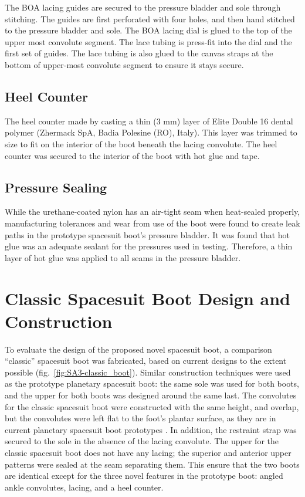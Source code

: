 \documentclass[defaultstyle,11pt]{comps}
\begin{document}
The BOA lacing guides are secured to the pressure bladder and sole through stitching.
The guides are first perforated with four holes, and then hand stitched to the pressure bladder and sole.
The BOA lacing dial is glued to the top of the upper most convolute segment.
The lace tubing is press-fit into the dial and the first set of guides.
The lace tubing is also glued to the canvas straps at the bottom of upper-most convolute segment to ensure it stays secure.

\hypertarget{heel-counter-1}{%
\subsection{Heel Counter}\label{heel-counter-1}}

The heel counter made by casting a thin (3 mm) layer of Elite Double 16 dental polymer (Zhermack SpA, Badia Polesine (RO), Italy).
This layer was trimmed to size to fit on the interior of the boot beneath the lacing convolute.
The heel counter was secured to the interior of the boot with hot glue and tape.

\hypertarget{pressure-sealing}{%
\subsection{Pressure Sealing}\label{pressure-sealing}}

While the urethane-coated nylon has an air-tight seam when heat-sealed properly, manufacturing tolerances and wear from use of the boot were found to create leak paths in the prototype spacesuit boot's pressure bladder.
It was found that hot glue was an adequate sealant for the pressures used in testing.
Therefore, a thin layer of hot glue was applied to all seams in the pressure bladder.

\hypertarget{classic-spacesuit-boot-design-and-construction}{%
\section{Classic Spacesuit Boot Design and Construction}\label{classic-spacesuit-boot-design-and-construction}}

To evaluate the design of the proposed novel spacesuit boot, a comparison ``classic'' spacesuit boot was fabricated, based on current designs to the extent possible (fig.~\ref{fig:SA3-classic_boot}).
Similar construction techniques were used as the prototype planetary spacesuit boot: the same sole was used for both boots, and the upper for both boots was designed around the same last.
The convolutes for the classic spacesuit boot were constructed with the same height, and overlap, but the convolutes were left flat to the foot's plantar surface, as they are in current planetary spacesuit boot prototypes \citep{Ross2002}.
In addition, the restraint strap was secured to the sole in the absence of the lacing convolute.
The upper for the classic spacesuit boot does not have any lacing; the superior and anterior upper patterns were sealed at the seam separating them.
This ensure that the two boots are identical except for the three novel features in the prototype boot: angled ankle convolutes, lacing, and a heel counter.
\end{document}
